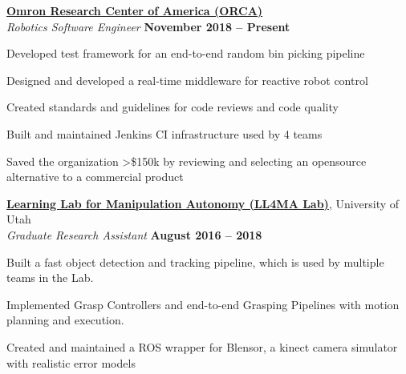 \documentclass[margin, line]{resume}
\begin{document}
\begin{resume}
    \href{https://www.omron.com/global/americas/usa.html}{\textbf{Omron Research Center of America (ORCA)}} \vspace{1pt}\\\vspace{1pt}%
    \textsl{Robotics Software Engineer} \hfill \textbf{November 2018 -- Present}\\ \vspace{-4.5mm}
    \begin{list2}
        \item Developed test framework for an end-to-end random bin picking pipeline
        \item Designed and developed a real-time middleware for reactive robot control
        \item Created standards and guidelines for code reviews and code quality
        \item Built and maintained Jenkins CI infrastructure used by 4 teams
        \item Saved the organization >\$150k by reviewing and selecting an 
        opensource \\alternative to a commercial product
    \end{list2}\vspace{-2.25mm}

    \href{https://robot-learning.cs.utah.edu}{\textbf{Learning Lab for Manipulation Autonomy (LL4MA Lab)}}, University of Utah \vspace{1pt}\\\vspace{1pt}%
    \textsl{Graduate Research Assistant} \hfill \textbf{August 2016 -- 2018}\\ \vspace{-4.5mm}
    \begin{list2}
        \item Built a fast object detection and tracking pipeline, which is
        used by multiple teams in the Lab.
        \item Implemented Grasp Controllers and end-to-end Grasping Pipelines
        with motion planning and execution.
        \item Created and maintained a ROS wrapper for Blensor, a kinect camera
        simulator with realistic error models
    \end{list2}\vspace{-0.1mm}


\end{resume}
\end{document}
